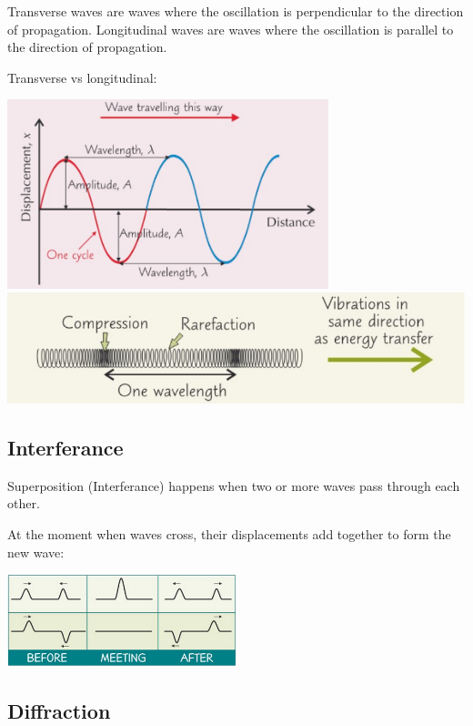 \documentclass[a4paper, 12pt]{article}
\begin{document}
Transverse waves are waves where the oscillation is perpendicular to the direction of propagation. Longitudinal waves are waves where the oscillation is parallel to the direction of propagation.

Transverse vs longitudinal:

\begin{center}
\includegraphics[width=0.7\textwidth]{images/transverseWave.png}
\includegraphics[width=\textwidth]{images/longitudinalWave.png}
\end{center}

\subsection{Interferance}

Superposition (Interferance) happens when two or more waves pass through each other.

At the moment when waves cross, their displacements add together to form the new wave:

\begin{center}
\includegraphics[width=0.5\textwidth]{images/superposition.png}
\end{center}

\subsection{Diffraction}
\end{document}
